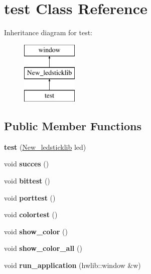 \hypertarget{classtest}{}\section{test Class Reference}
\label{classtest}
Inheritance diagram for test\+:\begin{figure}[H]
\begin{center}
\leavevmode
\includegraphics[height=3.000000cm]{classtest}
\end{center}
\end{figure}
\subsection*{Public Member Functions}
\begin{DoxyCompactItemize}
\item 
\mbox{\label{classtest_a6910701f76a4e07ac7095147e9e5841e}} 
{\bfseries test} (\mbox{\hyperlink{class_new__ledsticklib}{New\+\_\+ledsticklib}} led)
\item 
\mbox{\label{classtest_adf5e811e9833d52d70a464313cb33ce2}} 
void {\bfseries succes} ()
\item 
\mbox{\label{classtest_ab0efa79dd9775811215b0659b8c6dc15}} 
void {\bfseries bittest} ()
\item 
\mbox{\label{classtest_aef2231ca74c1464e195a7f41d3963b7d}} 
void {\bfseries porttest} ()
\item 
\mbox{\label{classtest_a602d1cb75b64d1c42a34de2220e42535}} 
void {\bfseries colortest} ()
\item 
\mbox{\label{classtest_accf58fd80d1fe75c44d9122428078dde}} 
void {\bfseries show\+\_\+color} ()
\item 
\mbox{\label{classtest_ad67927b82cdd34ec1d9bead800617d35}} 
void {\bfseries show\+\_\+color\+\_\+all} ()
\item 
\mbox{\label{classtest_ab66c4832af653c5ef199383a2b263a71}} 
void {\bfseries run\+\_\+application} (hwlib\+::window \&w)
\end{DoxyCompactItemize}
